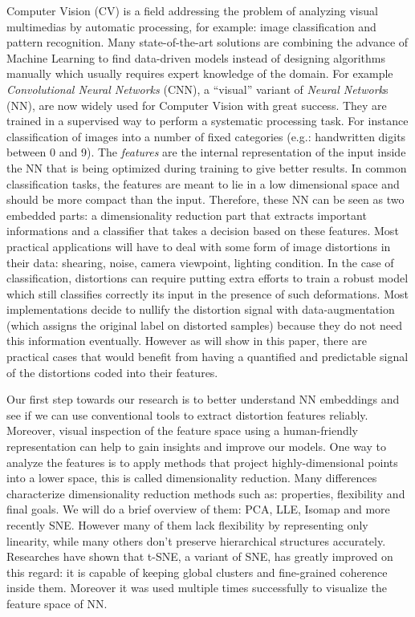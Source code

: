 \documentclass[a4paper,12pt]{report}
\newcommand{\eg}{e.g.}
\begin{document}
Computer Vision (CV) is a field addressing the problem of analyzing visual multimedias by automatic processing, for example: image classification and pattern recognition.
Many state-of-the-art solutions are combining the advance of Machine Learning to find data-driven models instead of designing algorithms manually which usually requires expert knowledge of the domain.
For example {\em Convolutional Neural Networks} (CNN), a ``visual'' variant of {\em Neural Network}s (NN), are now widely used for Computer Vision with great success\cite{krizhevsky2012imagenet}\cite{rowley1998neural}\cite{prechelt1994proben1}.
They are trained in a supervised way to perform a systematic processing task.
For instance classification of images into a number of fixed categories (\eg: handwritten digits between 0 and 9).
The {\em features} are the internal representation of the input inside the NN that is being optimized during training to give better results.
In common classification tasks, the features are meant to lie in a low dimensional space and should be more compact than the input.
Therefore, these NN can be seen as two embedded parts: a dimensionality reduction part that extracts important informations and a classifier that takes a decision based on these features.
Most practical applications will have to deal with some form of image distortions in their data: shearing, noise, camera viewpoint, lighting condition.
In the case of classification, distortions can require putting extra efforts to train a robust model which still classifies correctly its input in the presence of such deformations.
Most implementations decide to nullify the distortion signal with data-augmentation (which assigns the original label on distorted samples) because they do not need this information eventually.
However as will show in this paper, there are practical cases that would benefit from having a quantified and predictable signal of the distortions coded into their features.

Our first step towards our research is to better understand NN embeddings and see if we can use conventional tools to extract distortion features reliably.
Moreover, visual inspection of the feature space using a human-friendly representation can help to gain insights and improve our models.
One way to analyze the features is to apply methods that project highly-dimensional points into a lower space, this is called dimensionality reduction.
Many differences characterize dimensionality reduction methods such as: properties, flexibility and final goals.
We will do a brief overview of them: PCA, LLE, Isomap and more recently SNE.
However many of them lack flexibility by representing only linearity, while many others don't preserve hierarchical structures accurately\cite{t-SNE}.
Researches have shown that t-SNE, a variant of SNE, has greatly improved on this regard: it is capable of keeping global clusters and fine-grained coherence inside them.
Moreover it was used multiple times successfully to visualize the feature space of NN\cite{donahue2013decaf}\cite{yu2014visualizing}.
\end{document}

